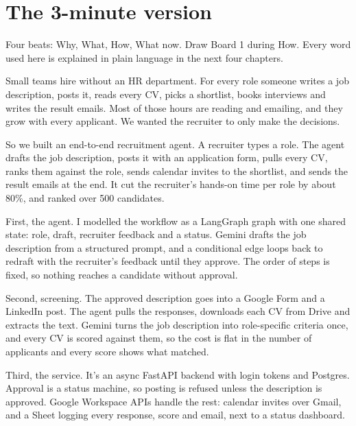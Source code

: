 \chapter{The 3-minute version}
\label{ch:three}

Four beats: Why, What, How, What now. Draw Board 1 during How. Every word used here is explained in plain language in the next four chapters.

\begin{sayit}
Small teams hire without an HR department. For every role someone writes a job description, posts it, reads every CV, picks a shortlist, books interviews and writes the result emails. Most of those hours are reading and emailing, and they grow with every applicant. We wanted the recruiter to only make the decisions.
\end{sayit}

\begin{sayit}
So we built an end-to-end recruitment agent. A recruiter types a role. The agent drafts the job description, posts it with an application form, pulls every CV, ranks them against the role, sends calendar invites to the shortlist, and sends the result emails at the end. It cut the recruiter's hands-on time per role by about 80\%, and ranked over 500 candidates.
\end{sayit}

\begin{sayit}
First, the agent. I modelled the workflow as a LangGraph graph with one shared state: role, draft, recruiter feedback and a status. Gemini drafts the job description from a structured prompt, and a conditional edge loops back to redraft with the recruiter's feedback until they approve. The order of steps is fixed, so nothing reaches a candidate without approval.

Second, screening. The approved description goes into a Google Form and a LinkedIn post. The agent pulls the responses, downloads each CV from Drive and extracts the text. Gemini turns the job description into role-specific criteria once, and every CV is scored against them, so the cost is flat in the number of applicants and every score shows what matched.

Third, the service. It's an async FastAPI backend with login tokens and Postgres. Approval is a status machine, so posting is refused unless the description is approved. Google Workspace APIs handle the rest: calendar invites over Gmail, and a Sheet logging every response, score and email, next to a status dashboard.
\end{sayit}

